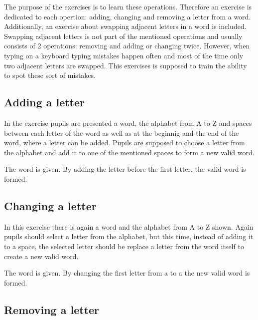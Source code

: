 The purpose of the  exercises is to learn these operations. Therefore an exercise is dedicated to each opertion: adding, changing and removing a letter from a word. Additionally, an exercise about swapping adjacent letters in a word is included. Swapping adjacent letters is not part of the mentioned operations and usually consists of 2 operations: removing and adding or changing twice. However, when typing on a keyboard typing mistakes happen often and most of the time only two adjacent letters are swapped. This exercises is supposed to train the ability to spot these sort of mistakes.

\subsection*{Adding a letter}
\label{subsection:addingLetter}

In the  exercise pupils are presented a word, the alphabet from A to Z and spaces between each letter of the word as well as at the beginnig and the end of the word, where a letter can be added. Pupils are supposed to choose a letter from the alphabet and add it to one of the mentioned spaces to form a new valid word.

\begin{example}
    The word  is given. By adding the letter  before the first letter, the valid word  is formed.
\end{example}

\subsection*{Changing a letter}
\label{subsection:changingLetter}

In this exercise there is again a word and the alphabet from A to Z shown. Again pupils should select a letter from the alphabet, but this time, instead of adding it to a space, the selected letter should be replace a letter from the word itself to create a new valid word.

\begin{example}
    The word  is given. By changing the first letter from a  to a  the new valid word  is formed.
\end{example}

\subsection*{Removing a letter}
\label{subsection:removingLetters}

